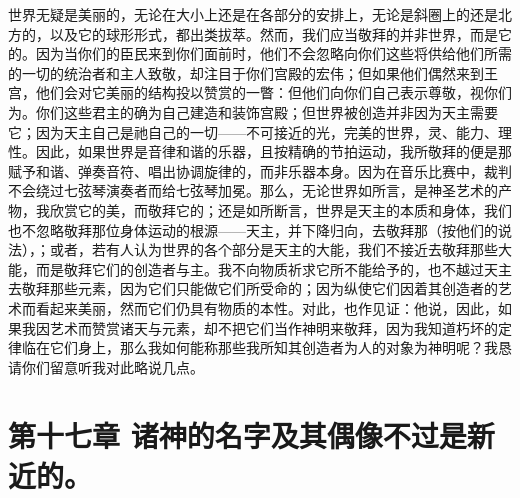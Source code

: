 世界无疑是美丽的，无论在大小上还是在各部分的安排上，无论是斜圈上的还是北方的，以及它的球形形式，都出类拔萃。然而，我们应当敬拜的并非世界，而是它的。因为当你们的臣民来到你们面前时，他们不会忽略向你们这些将供给他们所需的一切的统治者和主人致敬，却注目于你们宫殿的宏伟；但如果他们偶然来到王宫，他们会对它美丽的结构投以赞赏的一瞥：但他们向你们自己表示尊敬，视你们为。你们这些君主的确为自己建造和装饰宫殿；但世界被创造并非因为天主需要它；因为天主自己是祂自己的一切——不可接近的光，完美的世界，灵、能力、理性。因此，如果世界是音律和谐的乐器，且按精确的节拍运动，我所敬拜的便是那赋予和谐、弹奏音符、唱出协调旋律的，而非乐器本身。因为在音乐比赛中，裁判不会绕过七弦琴演奏者而给七弦琴加冕。那么，无论世界如所言，是神圣艺术的产物，我欣赏它的美，而敬拜它的；还是如所断言，世界是天主的本质和身体，我们也不忽略敬拜那位身体运动的根源——天主，并下降归向，去敬拜那（按他们的说法），；或者，若有人认为世界的各个部分是天主的大能，我们不接近去敬拜那些大能，而是敬拜它们的创造者与主。我不向物质祈求它所不能给予的，也不越过天主去敬拜那些元素，因为它们只能做它们所受命的；因为纵使它们因着其创造者的艺术而看起来美丽，然而它们仍具有物质的本性。对此，也作见证：他说，因此，如果我因艺术而赞赏诸天与元素，却不把它们当作神明来敬拜，因为我知道朽坏的定律临在它们身上，那么我如何能称那些我所知其创造者为人的对象为神明呢？我恳请你们留意听我对此略说几点。\par


\section{第十七章 诸神的名字及其偶像不过是新近的。}

